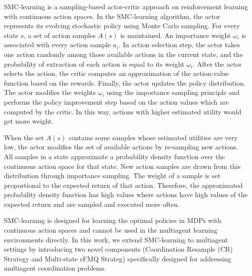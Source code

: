 \documentclass[journal,transmag]{IEEEtran}
\begin{document}
SMC-learning  \cite{Lazaric2007Reinforcement} is a sampling-based actor-critic approach on reinforcement learning with continuous action spaces. %
In the SMC-learning algorithm, the actor represents its evolving stochastic policy using Monte Carlo sampling. For every state $s$, a set of action samples $A(s)$ is maintained. An importance weight $\omega_i$ is associated with every action sample $a_i$. In action selection step, the actor takes one action randomly among those available actions in the current state, and the probability of extraction of each action is equal to its weight $\omega_i$. After the actor selects the action, the critic computes an approximation of the action-value function based on the rewards. Finally, the actor updates the policy distribution. The actor modifies the weights $\omega_i$ using the importance sampling principle and performs the policy improvement step based on the action values which are computed by the critic. In this way, actions with higher estimated utility would get more weight.

When the set $A(s)$ contains some samples whose estimated utilities are very low, the actor modifies the set of available actions by re-sampling new actions. All samples in a state approximate a probability density function over the continuous action space for that state. New action samples are drawn from this distribution through importance sampling. The weight of a sample is set proportional to the expected return of that action. Therefore, the approximated probability density function has high values where actions have high values of the expected return and are sampled and executed more often.

SMC-learning is designed for learning the optimal policies in MDPs with continuous action spaces and cannot be used in the multiagent learning environments directly.  In this work, we extend SMC-learning to multiagent settings by introducing two novel components (Coordination Resample (CR) Strategy and Multi-state rFMQ Strateg) specifically designed for addressing multiagent coordination problems.%
\end{document}
